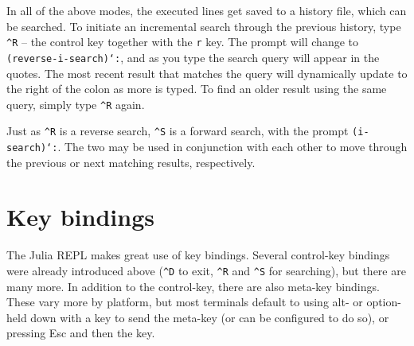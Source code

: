 In all of the above modes, the executed lines get saved to a history file, which can be searched.  To initiate an incremental search through the previous history, type \texttt{{\textasciicircum}R} – the control key together with the \texttt{r} key. The prompt will change to \texttt{(reverse-i-search)`{\textquotesingle}:}, and as you type the search query will appear in the quotes. The most recent result that matches the query will dynamically update to the right of the colon as more is typed. To find an older result using the same query, simply type \texttt{{\textasciicircum}R} again.



Just as \texttt{{\textasciicircum}R} is a reverse search, \texttt{{\textasciicircum}S} is a forward search, with the prompt \texttt{(i-search)`{\textquotesingle}:}.  The two may be used in conjunction with each other to move through the previous or next matching results, respectively.



\hypertarget{11229238099061625177}{}


\section{Key bindings}



The Julia REPL makes great use of key bindings. Several control-key bindings were already introduced above (\texttt{{\textasciicircum}D} to exit, \texttt{{\textasciicircum}R} and \texttt{{\textasciicircum}S} for searching), but there are many more. In addition to the control-key, there are also meta-key bindings. These vary more by platform, but most terminals default to using alt- or option- held down with a key to send the meta-key (or can be configured to do so), or pressing Esc and then the key.




